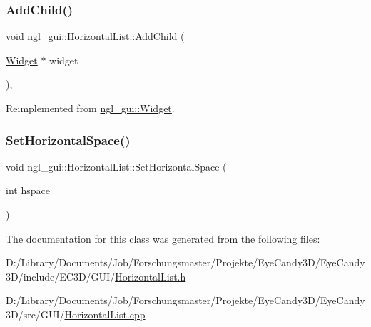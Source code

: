\subsubsection{\texorpdfstring{Add\+Child()}{AddChild()}}
{\footnotesize\ttfamily void ngl\+\_\+gui\+::\+Horizontal\+List\+::\+Add\+Child (\begin{DoxyParamCaption}\item[{\mbox{\hyperlink{classngl__gui_1_1_widget}{Widget}} $\ast$}]{widget }\end{DoxyParamCaption})\hspace{0.3cm}{\ttfamily [override]}, {\ttfamily [virtual]}}



Reimplemented from \mbox{\hyperlink{classngl__gui_1_1_widget_a37128e55931fa4fe2f99556d4a45607a}{ngl\+\_\+gui\+::\+Widget}}.

\mbox{\label{classngl__gui_1_1_horizontal_list_affeae11b3f463f65d870938e525ab14d}} 
\subsubsection{\texorpdfstring{Set\+Horizontal\+Space()}{SetHorizontalSpace()}}
{\footnotesize\ttfamily void ngl\+\_\+gui\+::\+Horizontal\+List\+::\+Set\+Horizontal\+Space (\begin{DoxyParamCaption}\item[{int}]{hspace }\end{DoxyParamCaption})}



The documentation for this class was generated from the following files\+:\begin{DoxyCompactItemize}
\item 
D\+:/\+Library/\+Documents/\+Job/\+Forschungsmaster/\+Projekte/\+Eye\+Candy3\+D/\+Eye\+Candy3\+D/include/\+E\+C3\+D/\+G\+U\+I/\mbox{\hyperlink{_horizontal_list_8h}{Horizontal\+List.\+h}}\item 
D\+:/\+Library/\+Documents/\+Job/\+Forschungsmaster/\+Projekte/\+Eye\+Candy3\+D/\+Eye\+Candy3\+D/src/\+G\+U\+I/\mbox{\hyperlink{_horizontal_list_8cpp}{Horizontal\+List.\+cpp}}\end{DoxyCompactItemize}

